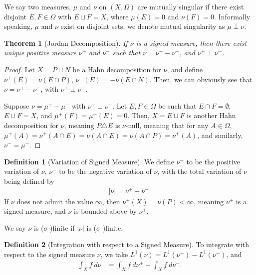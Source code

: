 \documentclass[10pt]{extarticle}
\theoremstyle{plain}
\newtheorem*{theorem}{Theorem}
\theoremstyle{definition}
\newtheorem*{definition}{Definition}
\theoremstyle{note}
\renewcommand{\newline}{\hfill\break}
\begin{document}
We say two measures, $\mu$ and $\nu$ on $(X,\Omega)$ are mutually singular if there exist disjoint $E,F\in \Omega$ with $E\sqcup F = X$, where $\mu(E) = 0$ and $\nu(F) = 0$. Informally speaking, $\mu$ and $\nu$ exist on disjoint sets; we denote mutual singularity as $\mu \perp \nu$.
\begin{theorem}[Jordan Decomposition]
  If $\nu$ is a signed measure, then there exist unique positive measure $\nu^{+}$ and $\nu^{-}$ such that $\nu = \nu^{+}-\nu^{-}$, and $\nu^{+}\perp \nu^{-}$.
\end{theorem}
\begin{proof}
  Let $X = P\sqcup N$ be a Hahn decomposition for $\nu$, and define $\nu^{+}\left(E\right) = \nu\left(E\cap P\right)$, $\nu^{-}\left(E\right)= -\nu\left(E\cap N\right)$. Then, we can obviously see that $\nu = \nu^{+} - \nu^{-}$, with $\nu^{+}\perp \nu^{-}$.\newline

  Suppose $\nu = \mu^{+} - \mu^{-}$ with $\nu^{+} \perp \nu^{-}$. Let $E,F\in \Omega$ be such that $E\cap F = \emptyset$, $E\cup F = X$, and $\mu^{+}\left(F\right) = \mu^{-}\left(E\right) = 0$. Then, $X = E \sqcup F$ is another Hahn decomposition for $\nu$, meaning $P\triangle E$ is $\nu$-null, meaning that for any $A\in \Omega$, $\mu^{+}\left(A\right) = \nu^{+}\left(A\cap E\right) = \nu\left(A\cap E\right) = \nu\left(A\cap P\right) = \nu^{+}\left(A\right)$, and similarly, $\nu^{-} = \mu^{-}$.
\end{proof}
\begin{definition}[Variation of Signed Measure]
  We define $\nu^{+}$ to be the positive variation of $\nu$, $\nu^{-}$ to be the negative variation of $\nu$, with the total variation of $\nu$ being defined by
  \begin{align*}
    |\nu| = \nu^{+} + \nu^{-}.
  \end{align*}
  If $\nu$ does not admit the value $\infty$, then $\nu^{+}(X) = \nu(P) < \infty$, meaning $\nu^{+}$ is a signed measure, and $\nu$ is bounded above by $\nu^{+}$.\newline

We say $\nu$ is ($\sigma$-)finite if $|\nu|$ is ($\sigma$-)finite.
\end{definition}
\begin{definition}[Integration with respect to a Signed Measure]
  To integrate with respect to the signed measure $\nu$, we take $L^{1}\left(\nu\right) = L^{1}\left(\nu^{+}\right) - L^{1}\left(\nu^{-}\right)$, and
  \begin{align*}
    \int_{X}^{} f\:d\nu &= \int_{X}^{} f\:d\nu^{+} - \int_{X}^{} f\:d\nu^{-}.
  \end{align*}
\end{definition}
\end{document}
